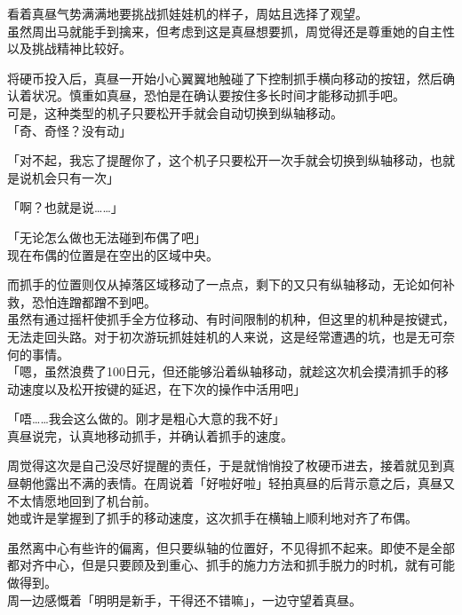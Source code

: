看着真昼气势满满地要挑战抓娃娃机的样子，周姑且选择了观望。\\

虽然周出马就能手到擒来，但考虑到这是真昼想要抓，周觉得还是尊重她的自主性以及挑战精神比较好。

将硬币投入后，真昼一开始小心翼翼地触碰了下控制抓手横向移动的按钮，然后确认着状况。慎重如真昼，恐怕是在确认要按住多长时间才能移动抓手吧。\\

可是，这种类型的机子只要松开手就会自动切换到纵轴移动。\\

「奇、奇怪？没有动」

「对不起，我忘了提醒你了，这个机子只要松开一次手就会切换到纵轴移动，也就是说机会只有一次」

「啊？也就是说……」

「无论怎么做也无法碰到布偶了吧」\\

现在布偶的位置是在空出的区域中央。

而抓手的位置则仅从掉落区域移动了一点点，剩下的又只有纵轴移动，无论如何补救，恐怕连蹭都蹭不到吧。\\

虽然有通过摇杆使抓手全方位移动、有时间限制的机种，但这里的机种是按键式，无法走回头路。对于初次游玩抓娃娃机的人来说，这是经常遭遇的坑，也是无可奈何的事情。\\

「嗯，虽然浪费了100日元，但还能够沿着纵轴移动，就趁这次机会摸清抓手的移动速度以及松开按键的延迟，在下次的操作中活用吧」

「唔……我会这么做的。刚才是粗心大意的我不好」\\

真昼说完，认真地移动抓手，并确认着抓手的速度。

周觉得这次是自己没尽好提醒的责任，于是就悄悄投了枚硬币进去，接着就见到真昼朝他露出不满的表情。在周说着「好啦好啦」轻拍真昼的后背示意之后，真昼又不太情愿地回到了机台前。\\

她或许是掌握到了抓手的移动速度，这次抓手在横轴上顺利地对齐了布偶。

虽然离中心有些许的偏离，但只要纵轴的位置好，不见得抓不起来。即使不是全部都对齐中心，但是只要顾及到重心、抓手的施力方法和抓手脱力的时机，就有可能做得到。\\

周一边感慨着「明明是新手，干得还不错嘛」，一边守望着真昼。\\

